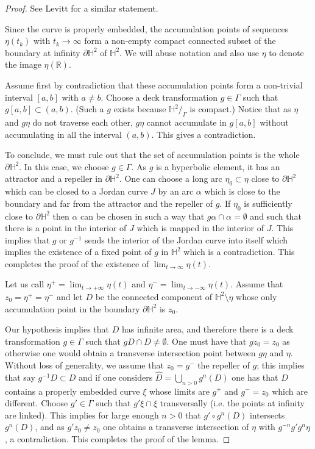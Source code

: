 \documentclass[11pt]{amsart} %
\numberwithin{equation}{section}
\theoremstyle{remark}
\begin{document}
\begin{proof} See Levitt \cite[Lemma 1]{Levitt} for a similar statement. %

Since the curve is properly embedded, the accumulation points of sequences $\eta(t_k)$ with $t_k \to \infty$ form a  non-empty compact connected subset of the boundary at infinity $\partial \mathbb{H}^2$ of $\mathbb{H}^2$. We will abuse notation and also use $\eta$ to denote the image $\eta(\mathbb{R})$.


Assume first by contradiction that these accumulation points form a non-trivial interval $[a,b]$ with $a\neq b$. Choose a deck transformation $g \in \Gamma$ such that $g [a,b] \subset (a,b)$. (Such a $g$ exists because $\mathbb{H}^2/_\Gamma$ is compact.) Notice that as $\eta$ and $g  \eta$ do not traverse each other, $g \eta$ cannot accumulate in $g [a,b]$ without accumulating in all the interval $(a,b)$. This gives a contradiction. 

%
To conclude, we must rule out that the set of accumulation points is the whole $\partial \mathbb{H}^2$. In this case, we choose $g \in \Gamma$. As $g$ is a hyperbolic element, it has an attractor and a repeller in $\partial \mathbb{H}^2$. One can choose a long arc $\eta_0 \subset \eta$ close to $\partial \mathbb{H}^2$ which can be closed to a Jordan curve $J$ by an arc $\alpha$ which is close to the boundary and far from the attractor and the repeller of $g$. If $\eta_0$ is sufficiently close to $\partial \mathbb{H}^2$ then $\alpha$ can be chosen in such a way that $g \alpha \cap \alpha = \emptyset$ and such that there is a point in the interior of $J$ which is mapped in the interior of $J$. This implies that $g$ or $g^{-1}$ sends the interior of the Jordan curve into itself which implies the existence of a fixed point of $g$ in $\mathbb{H}^2$ which is a contradiction. This completes the proof of the existence of $\lim_{t\to \infty} \eta(t)$. 

Let us call $\eta^+ = \lim_{t\to +\infty} \eta(t)$ and $\eta^- = \lim_{t \to -\infty} \eta(t)$. Assume that $z_0 = \eta^+ = \eta^-$ and let $D$ be the connected component of $\mathbb{H}^2 \setminus \eta$ whose only accumulation point in the boundary $\partial \mathbb{H}^2$ is $z_0$. 

Our hypothesis implies that $D$ has infinite area, and therefore there is a deck transformation $g \in \Gamma$ such that $g D \cap D \neq \emptyset$. One must have that $g z_0 = z_0$ as otherwise one would obtain a transverse intersection point between $g \eta$ and $\eta$. Without loss of generality, we assume that $z_0=g^-$ the repeller of $g$; this implies that say $g^{-1} D \subset D$ and if one considers $\hat D = \bigcup_{n>0} g^n(D)$ one has that $\hat D$ contains a properly embedded curve $\xi$ whose limits are $g^+$ and $g^-=z_0$ which are different. Choose $g' \in \Gamma$ such that $g' \xi \cap \xi$ transversally (i.e. the points at infinity are linked). This implies for large enough $n>0$ that $g' \circ g^n(D)$ intersects $g^n(D)$, and as $g' z_0 \neq z_0$ one obtains a transverse intersection of $\eta$ with $g^{-n} g' g^n \eta$, a contradiction. This completes the proof of the lemma.
%
\end{proof}
\end{document}
